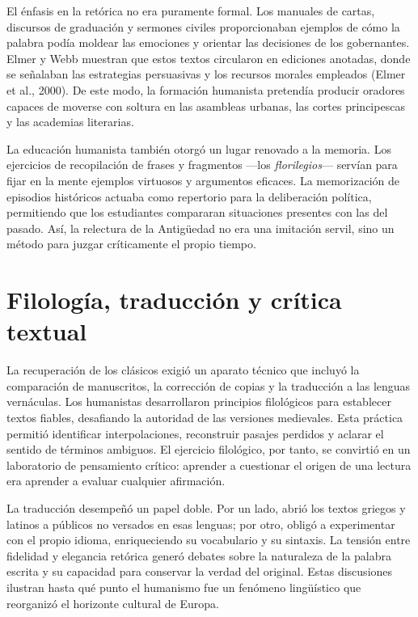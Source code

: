 El énfasis en la retórica no era puramente formal. Los manuales de cartas, discursos de graduación y sermones civiles proporcionaban ejemplos de cómo la palabra podía moldear las emociones y orientar las decisiones de los gobernantes. Elmer y Webb muestran que estos textos circularon en ediciones anotadas, donde se señalaban las estrategias persuasivas y los recursos morales empleados (Elmer et al., 2000). De este modo, la formación humanista pretendía producir oradores capaces de moverse con soltura en las asambleas urbanas, las cortes principescas y las academias literarias.

La educación humanista también otorgó un lugar renovado a la memoria. Los ejercicios de recopilación de frases y fragmentos —los \emph{florilegios}— servían para fijar en la mente ejemplos virtuosos y argumentos eficaces. La memorización de episodios históricos actuaba como repertorio para la deliberación política, permitiendo que los estudiantes compararan situaciones presentes con las del pasado. Así, la relectura de la Antigüedad no era una imitación servil, sino un método para juzgar críticamente el propio tiempo.

\section{Filología, traducción y crítica textual}
La recuperación de los clásicos exigió un aparato técnico que incluyó la comparación de manuscritos, la corrección de copias y la traducción a las lenguas vernáculas. Los humanistas desarrollaron principios filológicos para establecer textos fiables, desafiando la autoridad de las versiones medievales. Esta práctica permitió identificar interpolaciones, reconstruir pasajes perdidos y aclarar el sentido de términos ambiguos. El ejercicio filológico, por tanto, se convirtió en un laboratorio de pensamiento crítico: aprender a cuestionar el origen de una lectura era aprender a evaluar cualquier afirmación.

La traducción desempeñó un papel doble. Por un lado, abrió los textos griegos y latinos a públicos no versados en esas lenguas; por otro, obligó a experimentar con el propio idioma, enriqueciendo su vocabulario y su sintaxis. La tensión entre fidelidad y elegancia retórica generó debates sobre la naturaleza de la palabra escrita y su capacidad para conservar la verdad del original. Estas discusiones ilustran hasta qué punto el humanismo fue un fenómeno lingüístico que reorganizó el horizonte cultural de Europa.

